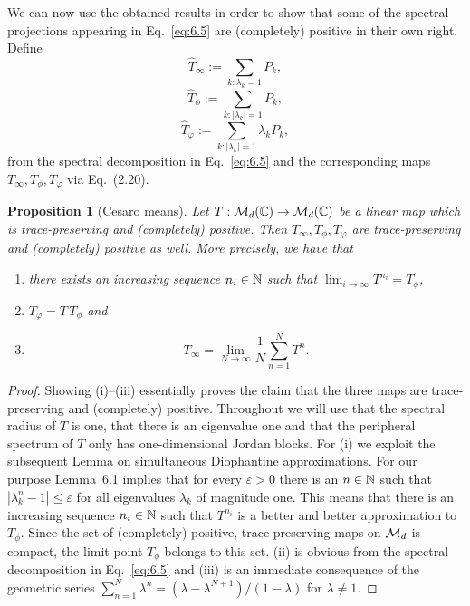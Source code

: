 \documentclass[11pt,a4paper]{article}
\theoremstyle{plain}
\newtheorem{proposition}{Proposition}[section]
\theoremstyle{definition}
\theoremstyle{remark}
\begin{document}
We can now use the obtained results in order to show that some of the spectral
projections appearing in Eq.~\eqref{eq:6.5} are (completely) positive in their
own right. Define
\begin{equation}\tag{6.11}\label{eq:6.11}
    \widehat{T}_\infty := \sum_{k:\lambda_k=1} P_k,
\end{equation}
\begin{equation}\tag{6.12}\label{eq:6.12}
    \widehat{T}_\phi := \sum_{k:|\lambda_k|=1} P_k,
\end{equation}
\begin{equation}\tag{6.13}\label{eq:6.13}
    \widehat{T}_\varphi := \sum_{k:|\lambda_k|=1} \lambda_k P_k,
\end{equation}
from the spectral decomposition in Eq.~\eqref{eq:6.5} and the corresponding maps
$T_\infty,T_\phi,T_\varphi$ via Eq.~(2.20).

\begin{proposition}[Cesaro means]
    Let $T:\mathcal{M}_d(\mathbb{C})\to\mathcal{M}_d(\mathbb{C})$ be a linear map which is trace-preserving and
    (completely) positive. Then $T_\infty,T_\phi,T_\varphi$ are trace-preserving and
    (completely) positive as well. More precisely, we have that
    \begin{enumerate}
        \item[(i)] there exists an increasing sequence $n_i\in\mathbb{N}$ such that
              $\lim_{i\to\infty} T^{n_i}=T_\phi$,
        \item[(ii)] $T_\varphi = T\,T_\phi$ and
        \item[(iii)]
              \begin{equation}\tag{6.14}\label{eq:6.14}
                  T_\infty=\lim_{N\to\infty}\frac{1}{N}\sum_{n=1}^N T^n.
              \end{equation}
    \end{enumerate}
\end{proposition}

\begin{proof}
    Showing (i)--(iii) essentially proves the claim that the three maps are
    trace-preserving and (completely) positive. Throughout we will use that the
    spectral radius of $T$ is one, that there is an eigenvalue one and that the
    peripheral spectrum of $T$ only has one-dimensional Jordan blocks. For (i) we
    exploit the subsequent Lemma on simultaneous Diophantine approximations. For
    our purpose Lemma~6.1 implies that for every $\varepsilon>0$ there is an $n\in\mathbb{N}$
    such that $|\lambda_k^n-1|\le \varepsilon$ for all eigenvalues $\lambda_k$ of
    magnitude one. This means that there is an increasing sequence $n_i\in\mathbb{N}$ such
    that $T^{n_i}$ is a better and better approximation to $T_\phi$. Since the set
    of (completely) positive, trace-preserving maps on $\mathcal{M}_d$ is compact, the
    limit point $T_\phi$ belongs to this set. (ii) is obvious from the spectral
    decomposition in Eq.~\eqref{eq:6.5} and (iii) is an immediate consequence of the
    geometric series $\sum_{n=1}^N \lambda^n = (\lambda-\lambda^{N+1})/(1-\lambda)$ for
    $\lambda\neq 1$.
\end{proof}
\end{document}
